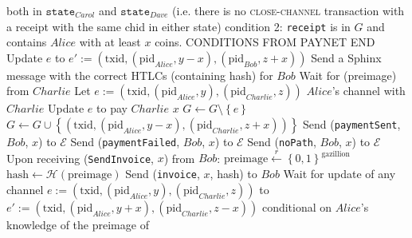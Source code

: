\begin{algorithmic}[1]
        both in $\mathtt{state}_{Carol}$ and $\mathtt{state}_{Dave}$ (i.e. there
        is no \textsc{close-channel} transaction with a receipt with the same
        chid in either state)
        \State condition 2: \texttt{receipt} is in $G$ and contains $Alice$ with
        at least $x$ coins.
        \State CONDITIONS FROM PAYNET END
      \EndIndent
        \State Update $e$ to $e' := \left(\mathrm{txid},
        \left(\mathrm{pid}_{Alice}, y - x\right),
        \left(\mathrm{pid}_{Bob}, z + x\right)\right)$ 
        \State Send a Sphinx~\cite{sphinx} message with the correct HTLCs
        (containing hash) for $Bob$
        \State {}
        \State Wait for (preimage) from $Charlie$
          \State Let $e := \left(\mathrm{txid}, \left(\mathrm{pid}_{Alice},
          y\right), \left(\mathrm{pid}_{Charlie}, z\right)\right)$ $Alice$'s
          channel with $Charlie$
          \State Update $e$ to pay $Charlie$ $x$ 
          \State $G \leftarrow G \setminus \left\{e\right\}$
          \State $G \leftarrow G \cup \left\{\left(\mathrm{txid},
          \left(\mathrm{pid}_{Alice}, y - x\right),
          \left(\mathrm{pid}_{Charlie}, z + x\right)\right)\right\}$
          \State Send (\texttt{paymentSent}, $Bob$, $x$) to $\mathcal{E}$
        \Else
          \State Send (\texttt{paymentFailed}, $Bob$, $x$) to $\mathcal{E}$
        \EndIf
      \Else {}
        \State Send (\texttt{noPath}, $Bob$, $x$) to $\mathcal{E}$
      \EndIf
    \State
    \State Upon receiving (\texttt{SendInvoice}, $x$) from $Bob$:
      \State $\mathrm{preimage} \overset{r}{\leftarrow}
      \left\{0,1\right\}^{\mathrm{gazillion}}$
      \State $\mathrm{hash} \leftarrow
      \mathcal{H}\left(\mathrm{preimage}\right)$
      \State Send (\texttt{invoice}, $x$, hash) to $Bob$
      \State Wait for update of any channel $e := \left(\mathrm{txid},
      \left(\mathrm{pid}_{Alice}, y\right), \left(\mathrm{pid}_{Charlie},
      z\right)\right)$ to $e' := \left(\mathrm{txid},
      \left(\mathrm{pid}_{Alice}, y + x\right), \left(\mathrm{pid}_{Charlie}, z
      - x\right)\right)$ conditional on $Alice$'s knowledge of the preimage of

\end{algorithmic}
